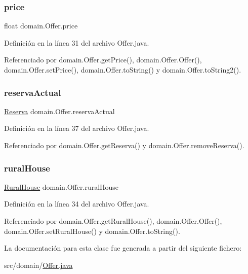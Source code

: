 \subsubsection{\texorpdfstring{price}{price}}
{\footnotesize\ttfamily float domain.\+Offer.\+price\hspace{0.3cm}{\ttfamily [private]}}



Definición en la línea 31 del archivo Offer.\+java.



Referenciado por domain.\+Offer.\+get\+Price(), domain.\+Offer.\+Offer(), domain.\+Offer.\+set\+Price(), domain.\+Offer.\+to\+String() y domain.\+Offer.\+to\+String2().

\mbox{\label{classdomain_1_1_offer_a242b39ce62d475bd64ce18aff2bbfe4f}} 
\subsubsection{\texorpdfstring{reservaActual}{reservaActual}}
{\footnotesize\ttfamily \mbox{\hyperlink{classdomain_1_1_reserva}{Reserva}} domain.\+Offer.\+reserva\+Actual\hspace{0.3cm}{\ttfamily [private]}}



Definición en la línea 37 del archivo Offer.\+java.



Referenciado por domain.\+Offer.\+get\+Reserva() y domain.\+Offer.\+remove\+Reserva().

\mbox{\label{classdomain_1_1_offer_a122573abd92911b25cde7d7e84f488f5}} 
\subsubsection{\texorpdfstring{ruralHouse}{ruralHouse}}
{\footnotesize\ttfamily \mbox{\hyperlink{classdomain_1_1_rural_house}{Rural\+House}} domain.\+Offer.\+rural\+House\hspace{0.3cm}{\ttfamily [private]}}



Definición en la línea 34 del archivo Offer.\+java.



Referenciado por domain.\+Offer.\+get\+Rural\+House(), domain.\+Offer.\+Offer(), domain.\+Offer.\+set\+Rural\+House() y domain.\+Offer.\+to\+String().



La documentación para esta clase fue generada a partir del siguiente fichero\+:\begin{DoxyCompactItemize}
\item 
src/domain/\mbox{\hyperlink{_offer_8java}{Offer.\+java}}\end{DoxyCompactItemize}
